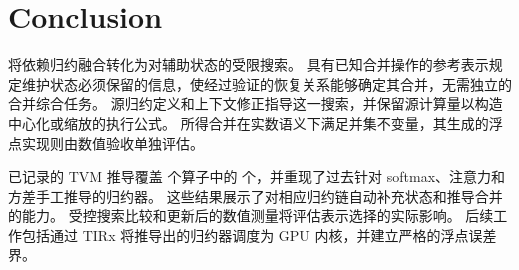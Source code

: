 \section{Conclusion}
\label{sec:conclusion}

\sys 将依赖归约融合转化为对辅助状态的受限搜索。
具有已知合并操作的参考表示规定维护状态必须保留的信息，使经过验证的恢复关系能够确定其合并，无需独立的合并综合任务。
源归约定义和上下文修正指导这一搜索，并保留源计算量以构造中心化或缩放的执行公式。
所得合并在实数语义下满足并集不变量，其生成的浮点实现则由数值验收单独评估。

已记录的 TVM 推导覆盖 \nShowcase 个算子中的 \nShowFused 个，并重现了过去针对 softmax、注意力和方差手工推导的归约器。
这些结果展示了对相应归约链自动补充状态和推导合并的能力。
受控搜索比较和更新后的数值测量将评估表示选择的实际影响。
后续工作包括通过 TIRx 将推导出的归约器调度为 GPU 内核，并建立严格的浮点误差界。
